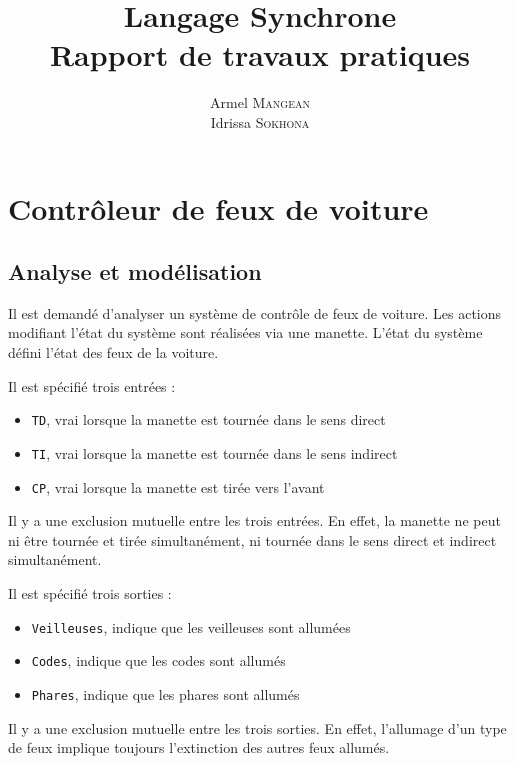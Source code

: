 \documentclass{article}
\title{
  {\bf Langage Synchrone} \\
  Rapport de travaux pratiques
}
\author{
  Armel   \textsc{Mangean} \\
  Idrissa \textsc{Sokhona}
}
\date{}
\begin{document}
  \maketitle
  \vfill

  \section{Contrôleur de feux de voiture}
    \subsection{Analyse et modélisation}

      Il est demandé d'analyser un système de contrôle de feux de
      voiture. Les actions modifiant l'état du système sont réalisées
      via une manette. L'état du système défini l'état des feux de la
      voiture. \medskip

      Il est spécifié trois entrées :
      \begin{itemize}
        \item {\tt TD}, vrai lorsque la manette est tournée dans le sens direct
        \item {\tt TI}, vrai lorsque la manette est tournée dans le sens indirect
        \item {\tt CP}, vrai lorsque la manette est tirée vers l'avant
      \end{itemize} \vspace{1em}

      Il y a une exclusion mutuelle entre les trois entrées. En effet,
      la manette ne peut ni être tournée et tirée simultanément, ni
      tournée dans le sens direct et indirect
      simultanément. \medskip

      Il est spécifié trois sorties :
      \begin{itemize}
        \item {\tt Veilleuses}, indique que les veilleuses sont allumées
        \item {\tt Codes}, indique que les codes sont allumés
        \item {\tt Phares}, indique que les phares sont allumés
      \end{itemize} \vspace{1em}

      Il y a une exclusion mutuelle entre les trois sorties. En effet,
      l'allumage d'un type de feux implique toujours l'extinction des
      autres feux allumés. \medskip
\end{document}
